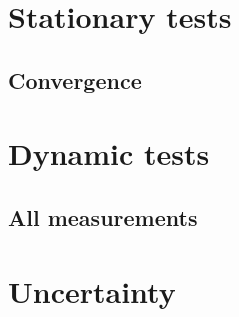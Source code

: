 
\section{Stationary tests}
    \subsection{Convergence}
\section{Dynamic tests}
    

    \subsection{All measurements}
\section{Uncertainty}




    

